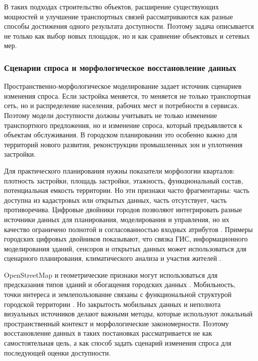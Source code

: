 В таких подходах строительство объектов, расширение существующих мощностей и улучшение транспортных связей рассматриваются как разные способы достижения одного результата доступности. Поэтому задача описывается не только как выбор новых площадок, но и как сравнение объектовых и сетевых мер.



\subsubsection{Сценарии спроса и морфологическое восстановление данных}
\label{subsubsec:demand-imputation-accessibility}

Пространственно-морфологическое моделирование задает источник сценариев изменения спроса. Если застройка меняется, то меняется не только транспортная сеть, но и распределение населения, рабочих мест и потребности в сервисах. Поэтому модели доступности должны учитывать не только изменение транспортного предложения, но и изменение спроса, который предъявляется к объектам обслуживания. В городском планировании это особенно важно для территорий нового развития, реконструкции промышленных зон и уплотнения застройки.

Для практического планирования нужны показатели морфологии кварталов: плотность застройки, площадь застройки, этажность, функциональный состав, потенциальная емкость территории. Но эти признаки часто фрагментарны: часть доступна из кадастровых или открытых данных, часть отсутствует, часть противоречива. Цифровые двойники городов позволяют интегрировать разные источники данных для планирования, моделирования и управления, но их качество ограничено полнотой и согласованностью входных атрибутов \cite{batty2018digitalTwin}. Примеры городских цифровых двойников показывают, что связка ГИС, информационного моделирования зданий, сенсоров и открытых данных может использоваться для сценарного планирования, климатического анализа и участия жителей \cite{dembski2020urbanDigitalTwin}.

OpenStreetMap и геометрические признаки могут использоваться для предсказания типов зданий и обогащения городских данных \cite{atwal2022buildingTypes}. Мобильность, точки интереса и землепользование связаны с функциональной структурой городской территории \cite{lenormand2015landUse}. Но закрытость мобильных данных и неполнота визуальных источников делают важными методы, которые используют локальный пространственный контекст и морфологические закономерности. Поэтому восстановление данных в таких постановках рассматривается не как самостоятельная цель, а как способ задать сценарий изменения спроса для последующей оценки доступности.


